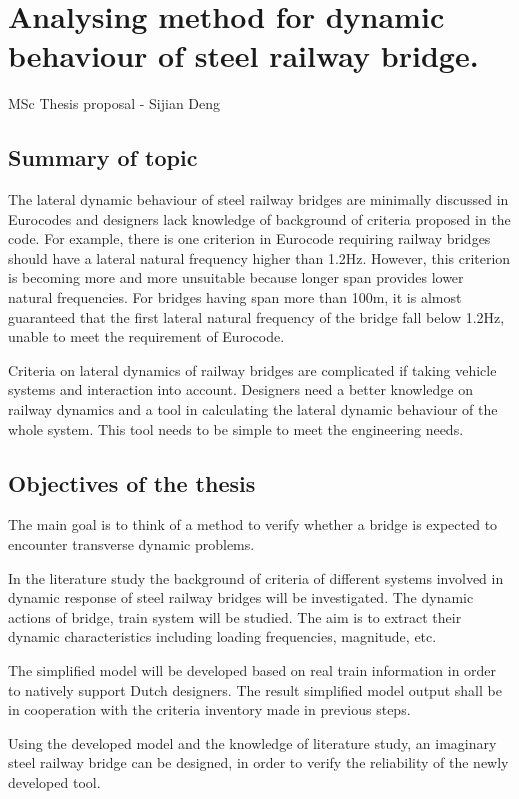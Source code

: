 \documentclass{report}
\begin{document}
\chapter*{Analysing method for dynamic behaviour of steel railway bridge.}

MSc Thesis proposal - Sijian Deng


\section*{Summary of topic}

The lateral dynamic behaviour of steel railway bridges are minimally discussed in Eurocodes and designers lack knowledge of background of criteria proposed in the code. For example, there is one criterion in Eurocode requiring railway bridges should have a lateral natural frequency higher than 1.2Hz. However, this criterion is becoming more and more unsuitable because longer span provides lower natural frequencies. For bridges having span more than 100m, it is almost guaranteed that the first lateral natural frequency of the bridge fall below 1.2Hz, unable to meet the requirement of Eurocode. 

Criteria on lateral dynamics of railway bridges are complicated if taking vehicle systems and interaction into account. Designers need a better knowledge on railway dynamics and a tool in calculating the lateral dynamic behaviour of the whole system. This tool needs to be simple to meet the engineering needs.  

\section*{Objectives of the thesis}
The main goal is to think of a method to verify whether a bridge is expected to encounter transverse dynamic problems. 

In the literature study the background of criteria of different systems involved in dynamic response of steel railway bridges will be investigated. The dynamic actions of bridge, train system will be studied. The aim is to extract their dynamic characteristics including loading frequencies, magnitude, etc.

The simplified model will be developed based on real train information in order to natively support Dutch designers. The result simplified model output shall be in cooperation with the criteria inventory made in previous steps.

Using the developed model and the knowledge of literature study, an imaginary steel railway bridge can be designed, in order to verify the reliability of the newly developed tool. 
\end{document}
